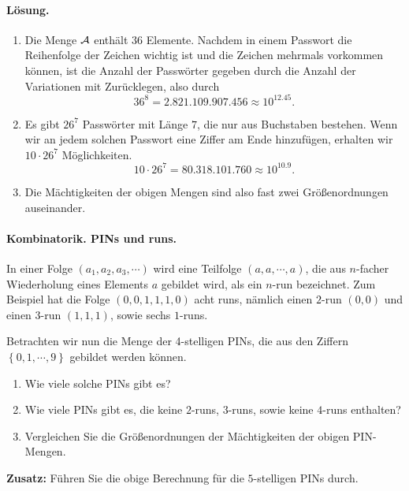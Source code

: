 \paragraph*{Lösung.} 
\begin{enumerate}
    \item Die Menge $\mathcal A$ enthält $36$ Elemente. Nachdem in einem Passwort die
        Reihenfolge der Zeichen wichtig ist und die Zeichen mehrmals vorkommen
        können, ist die Anzahl der Passwörter gegeben durch die Anzahl der
        Variationen mit Zurücklegen, also durch
        \begin{equation}
            36^{8} = 2.821.109.907.456 \approx 10^{12.45}.
        \end{equation}
    \item Es gibt $26^7$ Passwörter mit Länge $7$, die nur aus Buchstaben bestehen. 
        Wenn wir an jedem solchen Passwort eine Ziffer am Ende hinzufügen, 
        erhalten wir $10\cdot 26^7$ Möglichkeiten. 
        \begin{equation}
            10\cdot 26^7 = 80.318.101.760 \approx 10^{10.9}.
        \end{equation}
    \item Die Mächtigkeiten der obigen Mengen sind also fast zwei Größenordnungen 
        auseinander.
\end{enumerate}



\paragraph{Kombinatorik. PINs und runs.} In einer Folge $\left( a_1, a_2, a_3,
\cdots \right)$ wird eine Teilfolge $(a, a, \cdots, a)$, die aus $n$-facher
Wiederholung eines Elements $a$ gebildet wird, als ein $n$-run bezeichnet.
Zum Beispiel hat die Folge $(0, 0, 1, 1, 1, 0)$ acht runs, nämlich einen $2$-run
$(0,0)$ und einen $3$-run $(1,1,1)$, sowie sechs $1$-runs.

Betrachten wir nun die Menge der 4-stelligen PINs, die aus den Ziffern $\left\{
0,1, \cdots, 9 \right\}$ gebildet werden können. 
\begin{enumerate}
    \item Wie viele solche PINs gibt es?
    \item Wie viele PINs gibt es, die keine $2$-runs, $3$-runs, sowie keine
        $4$-runs enthalten?
    \item Vergleichen Sie die Größenordnungen der Mächtigkeiten der obigen
        PIN-Mengen. 
\end{enumerate}
\textbf{Zusatz:} Führen Sie die obige Berechnung für die $5$-stelligen PINs durch.

